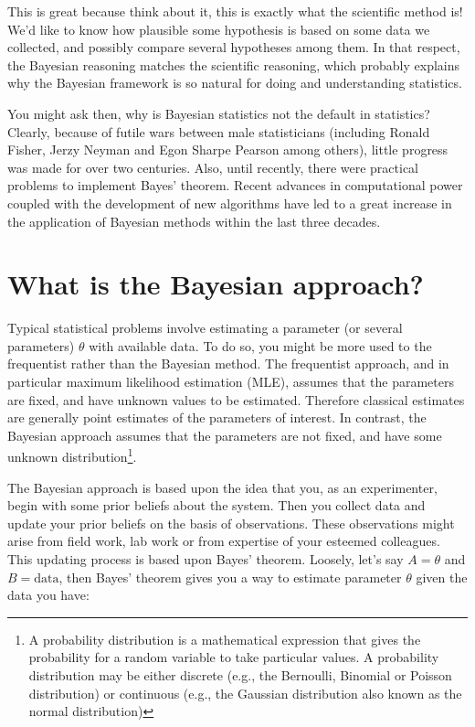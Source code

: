 \documentclass[
  12pt,
]{krantz}
\begin{document}
This is great because think about it, this is exactly what the scientific method is! We'd like to know how plausible some hypothesis is based on some data we collected, and possibly compare several hypotheses among them. In that respect, the Bayesian reasoning matches the scientific reasoning, which probably explains why the Bayesian framework is so natural for doing and understanding statistics.

You might ask then, why is Bayesian statistics not the default in statistics? Clearly, because of futile wars between male statisticians (including Ronald Fisher, Jerzy Neyman and Egon Sharpe Pearson among others), little progress was made for over two centuries. Also, until recently, there were practical problems to implement Bayes' theorem. Recent advances in computational power coupled with the development of new algorithms have led to a great increase in the application of Bayesian methods within the last three decades.

\hypertarget{what-is-the-bayesian-approach}{%
\section{What is the Bayesian approach?}\label{what-is-the-bayesian-approach}}

Typical statistical problems involve estimating a parameter (or several parameters) \(\theta\) with available data. To do so, you might be more used to the frequentist rather than the Bayesian method. The frequentist approach, and in particular maximum likelihood estimation (MLE), assumes that the parameters are fixed, and have unknown values to be estimated. Therefore classical estimates are generally point estimates of the parameters of interest. In contrast, the Bayesian approach assumes that the parameters are not fixed, and have some unknown distribution\footnote{A probability distribution is a mathematical expression that gives the probability for a random variable to take particular values. A probability distribution may be either discrete (e.g., the Bernoulli, Binomial or Poisson distribution) or continuous (e.g., the Gaussian distribution also known as the normal distribution)}.

The Bayesian approach is based upon the idea that you, as an experimenter, begin with some prior beliefs about the system. Then you collect data and update your prior beliefs on the basis of observations. These observations might arise from field work, lab work or from expertise of your esteemed colleagues. This updating process is based upon Bayes' theorem. Loosely, let's say \(A = \theta\) and \(B = \text{data}\), then Bayes' theorem gives you a way to estimate parameter \(\theta\) given the data you have:
\end{document}
